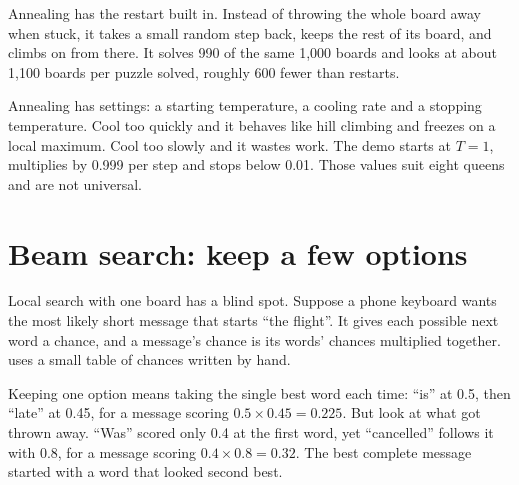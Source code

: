

Annealing has the restart built in. Instead of throwing the whole board away when stuck, it takes a small random step back, keeps the rest of its board, and climbs on from there. It solves 990 of the same 1,000 boards and looks at about 1,100 boards per puzzle solved, roughly 600 fewer than restarts.

\begin{pitfall}
Annealing has settings: a starting temperature, a cooling rate and a stopping temperature. Cool too quickly and it behaves like hill climbing and freezes on a local maximum. Cool too slowly and it wastes work. The demo starts at $T=1$, multiplies by 0.999 per step and stops below 0.01. Those values suit eight queens and are not universal.
\end{pitfall}

\section{Beam search: keep a few options}

Local search with one board has a blind spot. Suppose a phone keyboard wants the most likely short message that starts ``the flight''. It gives each possible next word a chance, and a message's chance is its words' chances multiplied together.  uses a small table of chances written by hand.

Keeping one option means taking the single best word each time: ``is'' at 0.5, then ``late'' at 0.45, for a message scoring $0.5\times0.45=0.225$. But look at what got thrown away. ``Was'' scored only 0.4 at the first word, yet ``cancelled'' follows it with 0.8, for a message scoring $0.4\times0.8=0.32$. The best complete message started with a word that looked second best.

